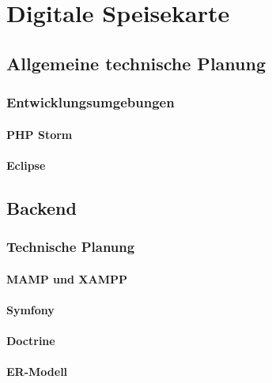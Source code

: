 \chapter{Digitale Speisekarte}
\renewcommand{\kapitelautor}{Autor: Katharina Joksch}

\section{Allgemeine technische Planung}

  \subsection{Entwicklungsumgebungen}

    \subsubsection{PHP Storm}

    \subsubsection{Eclipse}

\section{Backend}

  \subsection{Technische Planung}

    \subsubsection{MAMP und XAMPP}

    \subsubsection{Symfony}

    \subsubsection{Doctrine}

    \subsubsection{ER-Modell}


